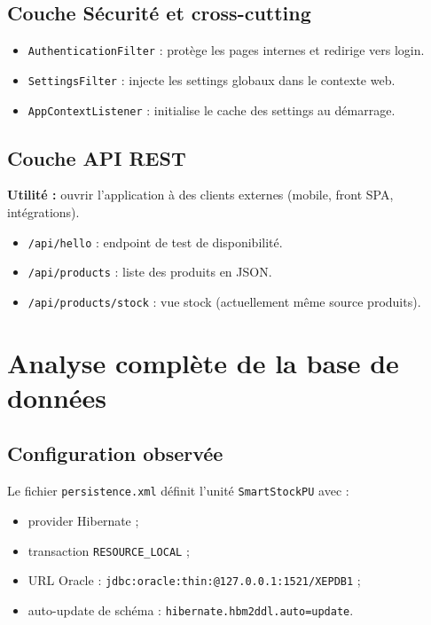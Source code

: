 \documentclass[12pt,a4paper]{report}
\begin{document}
\section{Couche S\'ecurit\'e et cross-cutting}
\begin{itemize}[leftmargin=1.2cm]
    \item \texttt{AuthenticationFilter} : prot\`ege les pages internes et redirige vers login.
    \item \texttt{SettingsFilter} : injecte les settings globaux dans le contexte web.
    \item \texttt{AppContextListener} : initialise le cache des settings au d\'emarrage.
\end{itemize}

\section{Couche API REST}
\textbf{Utilit\'e :} ouvrir l'application \`a des clients externes (mobile, front SPA, int\'egrations).
\begin{itemize}[leftmargin=1.2cm]
    \item \texttt{/api/hello} : endpoint de test de disponibilit\'e.
    \item \texttt{/api/products} : liste des produits en JSON.
    \item \texttt{/api/products/stock} : vue stock (actuellement m\^eme source produits).
\end{itemize}

\chapter{Analyse compl\`ete de la base de donn\'ees}

\section{Configuration observ\'ee}
Le fichier \texttt{persistence.xml} d\'efinit l'unit\'e \texttt{SmartStockPU} avec :
\begin{itemize}[leftmargin=1.2cm]
    \item provider Hibernate ;
    \item transaction \texttt{RESOURCE\_LOCAL} ;
    \item URL Oracle : \texttt{jdbc:oracle:thin:@127.0.0.1:1521/XEPDB1} ;
    \item auto-update de sch\'ema : \texttt{hibernate.hbm2ddl.auto=update}.
\end{itemize}
\end{document}

